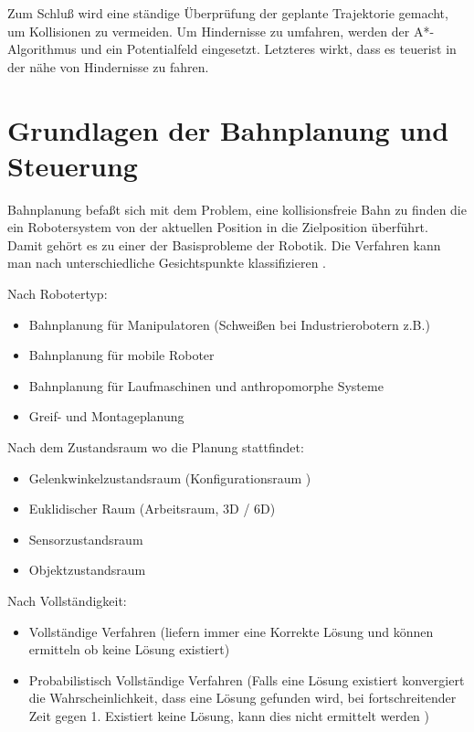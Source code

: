 Zum Schluß wird eine ständige Überprüfung der geplante Trajektorie gemacht, um Kollisionen zu vermeiden.
Um Hindernisse zu umfahren, werden der A*-Algorithmus und ein Potentialfeld eingesetzt.
Letzteres wirkt, dass es \glqq teuer\grqq \space ist in der nähe von Hindernisse zu fahren.



\section{Grundlagen der Bahnplanung und Steuerung}
\label{bahnplanung_grundlagen_sec}
\authorsection{\editoroier}


Bahnplanung befaßt sich mit dem Problem, eine kollisionsfreie Bahn zu finden die  ein Robotersystem
von der aktuellen Position in die Zielposition überführt. Damit gehört es zu einer der Basisprobleme der Robotik. Die Verfahren kann man nach unterschiedliche Gesichtspunkte klassifizieren \cite{rob1}.

Nach Robotertyp:
\begin{itemize}
\item Bahnplanung für Manipulatoren (Schweißen bei Industrierobotern z.B.)
\item Bahnplanung für mobile Roboter
\item Bahnplanung für Laufmaschinen und anthropomorphe Systeme
\item Greif- und Montageplanung
\end{itemize}

Nach dem Zustandsraum wo die Planung stattfindet:
\begin{itemize}
\item Gelenkwinkelzustandsraum (\gls{Konfigurationsraum} )
\item Euklidischer Raum (Arbeitsraum, 3D / 6D)
\item Sensorzustandsraum
\item Objektzustandsraum
\end{itemize}

Nach Vollständigkeit:
\begin{itemize}
\item Vollständige Verfahren (liefern immer eine Korrekte Lösung und können ermitteln ob keine Lösung existiert)
\item Probabilistisch Vollständige Verfahren (Falls eine Lösung existiert konvergiert die Wahrscheinlichkeit, dass eine Lösung gefunden wird, bei fortschreitender Zeit gegen 1. Existiert keine Lösung, kann dies nicht ermittelt werden
)
\end{itemize}

